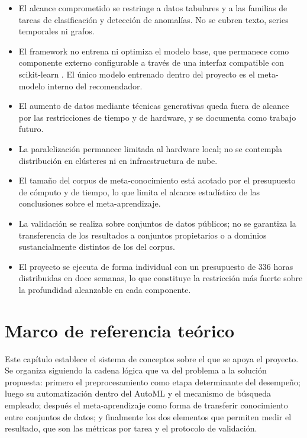 \documentclass[12pt,letterpaper,oneside]{article}
\begin{document}
\begin{itemize}
  \item El alcance comprometido se restringe a datos tabulares y a las familias de tareas
        de clasificación y detección de anomalías. No se cubren texto, series temporales
        ni grafos.
  \item El framework no entrena ni optimiza el modelo base, que permanece como componente
        externo configurable a través de una interfaz compatible con scikit-learn
        \cite{sklearn-docs}. El único modelo entrenado dentro del proyecto es el
        meta-modelo interno del recomendador.
  \item El aumento de datos mediante técnicas generativas queda fuera de alcance por las
        restricciones de tiempo y de hardware, y se documenta como trabajo futuro.
  \item La paralelización permanece limitada al hardware local; no se contempla
        distribución en clústeres ni en infraestructura de nube.
  \item El tamaño del corpus de meta-conocimiento está acotado por el presupuesto de
        cómputo y de tiempo, lo que limita el alcance estadístico de las conclusiones
        sobre el meta-aprendizaje.
  \item La validación se realiza sobre conjuntos de datos públicos; no se garantiza la
        transferencia de los resultados a conjuntos propietarios o a dominios
        sustancialmente distintos de los del corpus.
  \item El proyecto se ejecuta de forma individual con un presupuesto de 336 horas
        distribuidas en doce semanas, lo que constituye la restricción más fuerte sobre
        la profundidad alcanzable en cada componente.
\end{itemize}

\clearpage
\section{Marco de referencia teórico}
\label{sec:marco-teorico}

Este capítulo establece el sistema de conceptos sobre el que se apoya el proyecto. Se
organiza siguiendo la cadena lógica que va del problema a la solución propuesta: primero
el preprocesamiento como etapa determinante del desempeño; luego su automatización dentro
del AutoML y el mecanismo de búsqueda empleado; después el meta-aprendizaje como forma de
transferir conocimiento entre conjuntos de datos; y finalmente los dos elementos que
permiten medir el resultado, que son las métricas por tarea y el protocolo de validación.
\end{document}
